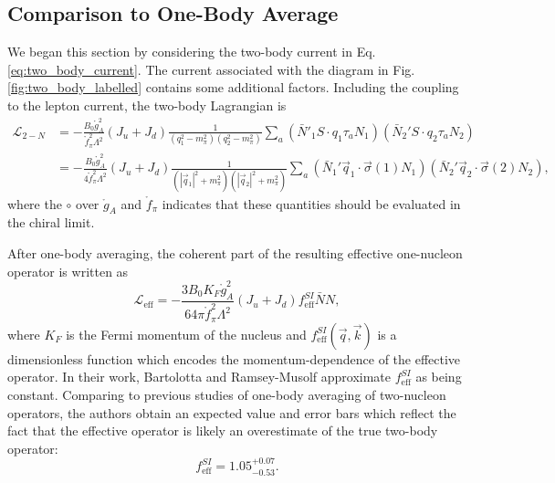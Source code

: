 \documentclass{book}[12pt]
\begin{document}
\subsection{Comparison to One-Body Average}
We began this section by considering the two-body current in Eq. \ref{eq:two_body_current}. The current associated with the diagram in Fig. \ref{fig:two_body_labelled} contains some additional factors. Including the coupling to the lepton current, the two-body Lagrangian is
\begin{equation}
\begin{split}
\mathcal{L}_{2-N}&=-\frac{B_0 \mathring{g}_A^2}{\mathring{f}_{\pi}^2\Lambda^2}\left(J_u+J_d\right)\frac{1}{\left(q_1^2-m_{\pi}^2\right)\left(q_2^2-m_{\pi}^2\right)}\sum_a\left(\bar{N}'_1 S\cdot q_1\tau_a N_1\right)\left(\bar{N}_2' S\cdot q_2 \tau_a N_2\right)\\
&=-\frac{B_0\mathring{g}_A^2}{4\mathring{f}_{\pi}^2\Lambda^2}\left(J_u+J_d\right)\frac{1}{\left(|\vec{q}_1|^2+m_{\pi}^2\right)\left(|\vec{q}_2|^2+m_{\pi}^2\right)}\sum_a \left(\bar{N}_1' \vec{q}_1\cdot\vec{\sigma}(1) N_1 \right)\left(\bar{N}_2' \vec{q}_2\cdot\vec{\sigma}(2) N_2\right),
\end{split}
\end{equation}
where the $\circ$ over $\mathring{g}_A$ and $\mathring{f}_{\pi}$ indicates that these quantities should be evaluated in the chiral limit.

After one-body averaging, the coherent part of the resulting effective one-nucleon operator is written as
\begin{equation}
\mathcal{L}_\mathrm{eff}=-\frac{3B_0K_F \mathring{g}_A^2}{64\pi \mathring{f}_{\pi}^2\Lambda^2}\left(J_u+J_d\right)f_\mathrm{eff}^{SI}\bar{N}N,
\end{equation}
where $K_F$ is the Fermi momentum of the nucleus and $f_\mathrm{eff}^{SI}(\vec{q},\vec{k})$ is a dimensionless function which encodes the momentum-dependence of the effective operator. In their work, Bartolotta and Ramsey-Musolf approximate $f_\mathrm{eff}^{SI}$ as being constant. Comparing to previous studies of one-body averaging of two-nucleon operators, the authors obtain an expected value and error bars which reflect the fact that the effective operator is likely an overestimate of the true two-body operator:
\begin{equation}
f_\mathrm{eff}^{SI}=1.05^{+0.07}_{-0.53}.
\end{equation}
\end{document}
